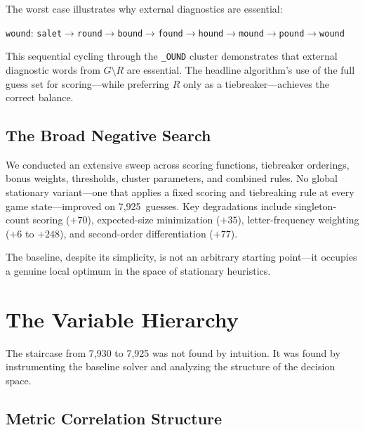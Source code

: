\documentclass[11pt]{article}
\begin{document}
	The worst case illustrates why external diagnostics are essential:
	\begin{center}
		\texttt{wound}: \texttt{salet}$\to$\texttt{round}$\to$\texttt{bound}$\to$\texttt{found}$\to$\texttt{hound}$\to$\texttt{mound}$\to$\texttt{pound}$\to$\texttt{wound}
	\end{center}
	This sequential cycling through the \texttt{\_OUND} cluster demonstrates that external diagnostic words from $G \setminus R$ are essential.  The headline algorithm's use of the full guess set for scoring---while preferring $R$ only as a tiebreaker---achieves the correct balance.
	
	\subsection{The Broad Negative Search}
	\label{sec:sweep}
	
	We conducted an extensive sweep across scoring functions, tiebreaker orderings, bonus weights, thresholds, cluster parameters, and combined rules.  No global stationary variant---one that applies a fixed scoring and tiebreaking rule at every game state---improved on 7,925~guesses.  Key degradations include singleton-count scoring ($+70$), expected-size minimization ($+35$), letter-frequency weighting ($+6$ to $+248$), and second-order differentiation ($+77$).
	
	The baseline, despite its simplicity, is not an arbitrary starting point---it occupies a genuine local optimum in the space of stationary heuristics.
	
	\section{The Variable Hierarchy}
	\label{sec:hierarchy}
	
	The staircase from 7,930 to 7,925 was not found by intuition.  It was found by instrumenting the baseline solver and analyzing the structure of the decision space.
	
	\subsection{Metric Correlation Structure}
	
\end{document}
